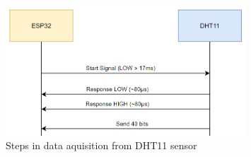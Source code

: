 \begin{figure}[H]
    \centering
    \includegraphics[width=0.8\textwidth]{images/dht-steps.png}
    \caption{Steps in data aquisition from DHT11 sensor}
    \label{fig:dht-steps}
\end{figure}
